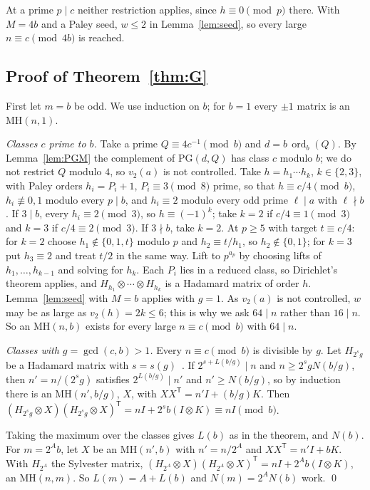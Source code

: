 \documentclass[10pt]{article}
\theoremstyle{remark}
\newcommand{\MH}{\mathrm{MH}}
\newcommand{\tr}{^{\mathsf T}}
\newcommand{\ord}{\operatorname{ord}}
\newcommand{\PG}{\mathrm{PG}}
\begin{document}
At a prime $p\mid c$ neither restriction applies, since $h\equiv0\pmod p$ there. With $M=4b$ and a Paley seed, $w\le2$ in Lemma~\ref{lem:seed}, so every large $n\equiv c\pmod{4b}$ is reached.

\subsection{Proof of Theorem~\ref{thm:G}}
First let $m=b$ be odd. We use induction on $b$; for $b=1$ every $\pm1$ matrix is an $\MH(n,1)$.

\emph{Classes $c$ prime to $b$.} Take a prime $Q\equiv4c^{-1}\pmod b$ and $d=b\,\ord_b(Q)$. By Lemma~\ref{lem:PGM} the complement of $\PG(d,Q)$ has class $c$ modulo $b$; we do not restrict $Q$ modulo $4$, so $v_2(a)$ is not controlled. Take $h=h_1\cdots h_k$, $k\in\{2,3\}$, with Paley orders $h_i=P_i+1$, $P_i\equiv3\pmod8$ prime, so that $h\equiv c/4\pmod b$, $h_i\not\equiv0,1$ modulo every $p\mid b$, and $h_i\equiv2$ modulo every odd prime $\ell\mid a$ with $\ell\nmid b$. If $3\mid b$, every $h_i\equiv2\pmod3$, so $h\equiv(-1)^k$; take $k=2$ if $c/4\equiv1\pmod 3$ and $k=3$ if $c/4\equiv2\pmod 3$. If $3\nmid b$, take $k=2$. At $p\ge5$ with target $t\equiv c/4$: for $k=2$ choose $h_1\notin\{0,1,t\}$ modulo $p$ and $h_2\equiv t/h_1$, so $h_2\notin\{0,1\}$; for $k=3$ put $h_3\equiv2$ and treat $t/2$ in the same way. Lift to $p^{a_p}$ by choosing lifts of $h_1,\dots,h_{k-1}$ and solving for $h_k$. Each $P_i$ lies in a reduced class, so Dirichlet's theorem applies, and $H_{h_1}\otimes\cdots\otimes H_{h_k}$ is a Hadamard matrix of order $h$. Lemma~\ref{lem:seed} with $M=b$ applies with $g=1$. As $v_2(a)$ is not controlled, $w$ may be as large as $v_2(h)=2k\le6$; this is why we ask $64\mid n$ rather than $16\mid n$. So an $\MH(n,b)$ exists for every large $n\equiv c\pmod b$ with $64\mid n$.

\emph{Classes with $g=\gcd(c,b)>1$.} Every $n\equiv c\pmod b$ is divisible by $g$. Let $H_{2^sg}$ be a Hadamard matrix with $s=s(g)$~\cite{Se76}. If $2^{s+L(b/g)}\mid n$ and $n\ge2^sgN(b/g)$, then $n'=n/(2^sg)$ satisfies $2^{L(b/g)}\mid n'$ and $n'\ge N(b/g)$, so by induction there is an $\MH(n',b/g)$, $X$, with $XX\tr=n'I+(b/g)K$. Then $(H_{2^sg}\otimes X)(H_{2^sg}\otimes X)\tr=nI+2^sb(I\otimes K)\equiv nI\pmod b$.

Taking the maximum over the classes gives $L(b)$ as in the theorem, and $N(b)$. For $m=2^Ab$, let $X$ be an $\MH(n',b)$ with $n'=n/2^A$ and $XX\tr=n'I+bK$. With $H_{2^A}$ the Sylvester matrix, $(H_{2^A}\otimes X)(H_{2^A}\otimes X)\tr=nI+2^Ab(I\otimes K)$, an $\MH(n,m)$. So $L(m)=A+L(b)$ and $N(m)=2^AN(b)$ work. \qed
\end{document}
